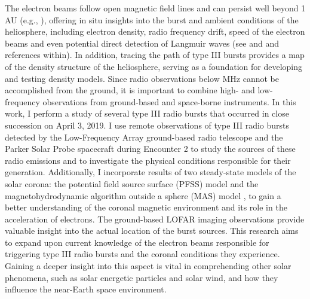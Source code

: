 The electron beams follow open magnetic field lines and can persist well beyond 1 AU (e.g., \cite{dulk_1985, boudjada_2020}), offering in situ insights into the burst and ambient conditions of the heliosphere, including electron density, radio frequency drift, speed of the electron beams and even potential direct detection of Langmuir waves (see \cite{gurnett_1976, gurnett_1977} and \cite{reid_2014} and references within). In addition, tracing the path of type III bursts provides a map of the density structure of the heliosphere, serving as a foundation for developing and testing density models.
Since radio observations below  MHz cannot be accomplished from the ground, it is important to combine high- and low-frequency observations from ground-based and space-borne instruments.
In this work, I perform a study of several type III radio bursts that occurred in close succession on April 3, 2019. I use remote observations of type III radio bursts detected by the Low-Frequency Array \cite[LOFAR]{lofar_2013} ground-based radio telescope and the Parker Solar Probe \cite[PSP]{fox_2016} spacecraft during Encounter 2 to study the sources of these radio emissions and to investigate the physical conditions responsible for their generation. Additionally, I incorporate results of two steady-state models of the solar corona: the potential field source surface (PFSS) model \cite{altschuler_1969, schatten_1969} and the magnetohydrodynamic algorithm outside a sphere (MAS) model \cite{mhd_1999}, to gain a better understanding of the coronal magnetic environment and its role in the acceleration of electrons. 
The ground-based LOFAR imaging observations provide valuable insight into the actual location of the burst sources. This research aims to expand upon current knowledge of the electron beams responsible for triggering type III radio bursts and the coronal conditions they experience. Gaining a deeper insight into this aspect is vital in comprehending other solar phenomena, such as solar energetic particles and solar wind, and how they influence the near-Earth space environment.


